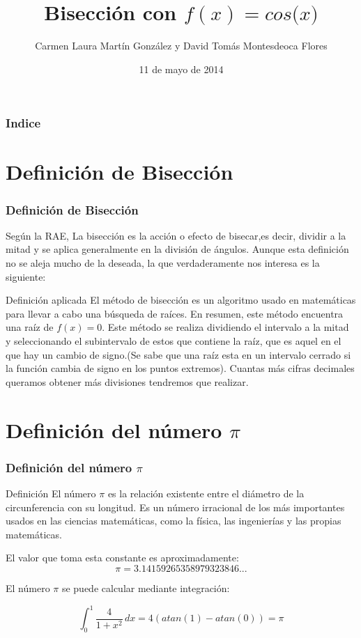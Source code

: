 \documentclass{beamer}
\title[La bisección de $f(x)=cos($\pi$x)$ en \textsc{Beamer}]{Bisección con $f(x)=cos($\pi$x)$}
\author[D. Montesdeoca y  L. Martín]{Carmen Laura Martín González
y
David Tomás Montesdeoca Flores}
\date[11/05/14]{11 de mayo de 2014}
\begin{document}
\begin{frame}
\titlepage
\end{frame}

\begin{frame}
\frametitle{Indice}
\tableofcontents[pausesections]

\end{frame}

\section{Definición de Bisección}

\begin{frame}
\frametitle{Definición de Bisección}

Según la RAE, La bisección es la acción o efecto de bisecar,es decir, dividir a la mitad y se aplica generalmente en la división de ángulos. Aunque esta definición no se aleja mucho de la deseada, la que verdaderamente nos interesa es la siguiente:

\begin{block}{Definición aplicada}
El método de bisección es un algoritmo usado en matemáticas para llevar a cabo una búsqueda de raíces. En resumen, este método encuentra una raíz de $f(x)=0$. Este método se realiza dividiendo el intervalo a la mitad y seleccionando el subintervalo de estos que contiene la raíz, que es aquel en el que hay un cambio de signo.(Se sabe que una raíz esta en un intervalo cerrado si la función cambia de signo en los puntos extremos). Cuantas más cifras decimales queramos obtener más divisiones tendremos que realizar.
\end{block} 

\end{frame}

\section{Definición del número $\pi$}

\begin{frame}
\frametitle{Definición del número $\pi$}
\begin{block}{Definición}
El número $\pi$ es la relación existente entre el diámetro de la circunferencia con su longitud.
Es un número irracional de los más importantes usados en las ciencias matemáticas, como la física, las ingenierías y las propias matemáticas.

El valor que toma esta constante es aproximadamente:
 $$\pi = 3.14159265358979323846...$$
\end{block}
El número $\pi$ se puede calcular mediante integración:

$$\int_{0}^{1} \! \frac{4}{1+x^2}\, dx = 4(atan(1) -atan(0)) = \pi $$

\end{frame}
\end{document}
